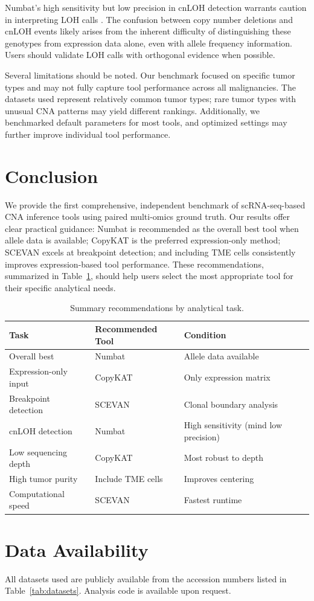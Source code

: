 \documentclass[11pt]{article}
\begin{document}
Numbat's high sensitivity but low precision in cnLOH detection warrants caution in interpreting LOH calls \citep{Gao2023}. The confusion between copy number deletions and cnLOH events likely arises from the inherent difficulty of distinguishing these genotypes from expression data alone, even with allele frequency information. Users should validate LOH calls with orthogonal evidence when possible.

Several limitations should be noted. Our benchmark focused on specific tumor types and may not fully capture tool performance across all malignancies. The datasets used represent relatively common tumor types; rare tumor types with unusual CNA patterns may yield different rankings. Additionally, we benchmarked default parameters for most tools, and optimized settings may further improve individual tool performance.

\section{Conclusion}

We provide the first comprehensive, independent benchmark of scRNA-seq-based CNA inference tools using paired multi-omics ground truth. Our results offer clear practical guidance: Numbat is recommended as the overall best tool when allele data is available; CopyKAT is the preferred expression-only method; SCEVAN excels at breakpoint detection; and including TME cells consistently improves expression-based tool performance. These recommendations, summarized in Table~\ref{tab:recommendations}, should help users select the most appropriate tool for their specific analytical needs.

\begin{table}[H]
\centering
\caption{Summary recommendations by analytical task.}
\label{tab:recommendations}
\begin{tabular}{lll}
\toprule
Task & Recommended Tool & Condition \\
\midrule
Overall best & Numbat & Allele data available \\
Expression-only input & CopyKAT & Only expression matrix \\
Breakpoint detection & SCEVAN & Clonal boundary analysis \\
cnLOH detection & Numbat & High sensitivity (mind low precision) \\
Low sequencing depth & CopyKAT & Most robust to depth \\
High tumor purity & Include TME cells & Improves centering \\
Computational speed & SCEVAN & Fastest runtime \\
\bottomrule
\end{tabular}
\end{table}

\section*{Data Availability}
All datasets used are publicly available from the accession numbers listed in Table~\ref{tab:datasets}. Analysis code is available upon request.



\end{document}
